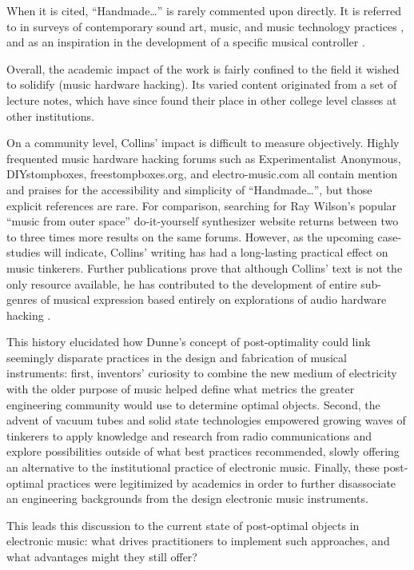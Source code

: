 When it is cited, “Handmade…” is rarely commented upon directly. It is referred to in surveys of contemporary sound art, music, and music technology practices \citep{kelly2011,mills2010,pigott2011,rodgers2010}, and as an inspiration in the development of a specific musical controller \citep{ariza2007,hoadley2010,murphy2010,riis2013,valle2011}.
	
Overall, the academic impact of the work is fairly confined to the field it wished to solidify (music hardware hacking). Its varied content originated from a set of lecture notes, which have since found their place in other college level classes at other institutions. 

On a community level, Collins’ impact is difficult to measure objectively. Highly frequented music hardware hacking forums such as Experimentalist Anonymous, DIYstompboxes, freestompboxes.org, and electro-music.com all contain mention and praises for the accessibility and simplicity of “Handmade…”, but those explicit references are rare. For comparison, searching for Ray Wilson’s popular “music from outer space” do-it-yourself synthesizer website returns between two to three times more results on the same forums. However, as the upcoming case-studies will indicate, Collins' writing has had a long-lasting practical effect on music tinkerers. Further publications prove that although Collins' text is not the only resource available, he has contributed to the development of entire sub-genres of musical expression based entirely on explorations of audio hardware hacking \citep{ghazala2004,hegarty2007,kelly2009}. 

\newpage

This history elucidated how Dunne's concept of post-optimality could link seemingly disparate practices in the design and fabrication of musical instruments: first, inventors' curiosity to combine the new medium of electricity with the older purpose of music helped define what metrics the greater engineering community would use to determine optimal objects. Second, the advent of vacuum tubes and solid state technologies empowered growing waves of tinkerers to apply knowledge and research from radio communications and explore possibilities outside of what best practices recommended, slowly offering an alternative to the institutional practice of electronic music. Finally, these post-optimal practices were legitimized by academics in order to further disassociate an engineering backgrounds from the design electronic music instruments. 

This leads this discussion to the current state of post-optimal objects in electronic music: what drives practitioners to implement such approaches, and what advantages might they still offer? 


